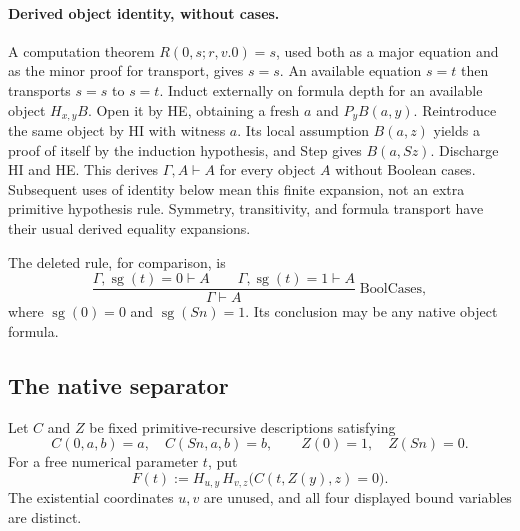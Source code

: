\paragraph{Derived object identity, without cases.}
A computation theorem $R(0,s;r,v.0)=s$, used both as a major equation
and as the minor proof for transport, gives $s=s$. An available equation
$s=t$ then transports $s=s$ to $s=t$. Induct externally on formula
depth for an available object $H_{x,y}B$. Open it by HE, obtaining a
fresh $a$ and $P_yB(a,y)$. Reintroduce the same object by HI with
witness $a$. Its local assumption $B(a,z)$ yields a proof of itself by
the induction hypothesis, and Step gives $B(a,Sz)$. Discharge HI and
HE. This derives $\Gamma,A\vdash A$ for every object $A$ without
Boolean cases. Subsequent uses of identity below mean this finite
expansion, not an extra primitive hypothesis rule. Symmetry, transitivity,
and formula transport have their usual derived equality expansions.

The deleted rule, for comparison, is
\[
 \frac{\Gamma,\operatorname{sg}(t)=0\vdash A\qquad
       \Gamma,\operatorname{sg}(t)=1\vdash A}
      {\Gamma\vdash A}\;\mathrm{BoolCases},
\]
where $\operatorname{sg}(0)=0$ and $\operatorname{sg}(Sn)=1$.
Its conclusion may be any native object formula.

\subsection{The native separator}

Let $C$ and $Z$ be fixed primitive-recursive descriptions satisfying
\[
 C(0,a,b)=a,\quad C(Sn,a,b)=b,\qquad
 Z(0)=1,\quad Z(Sn)=0.
\]
For a free numerical parameter $t$, put
\[
 \boxed{\quad F(t):=H_{u,y}\,H_{v,z}\bigl(C(t,Z(y),z)=0\bigr).\quad}
 \tag{*}
\]
The existential coordinates $u,v$ are unused, and all four displayed
bound variables are distinct.

